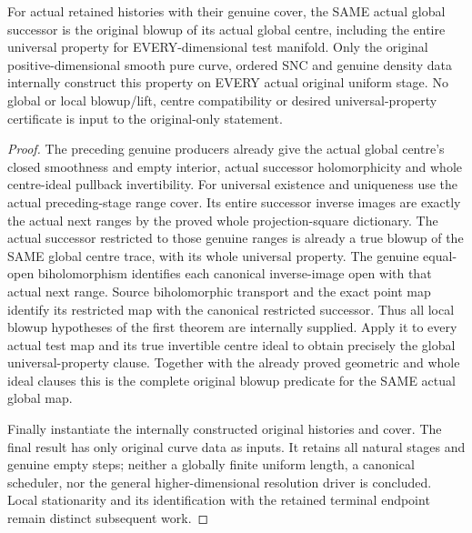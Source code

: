 \begin{theorem}
\label{hir:sharp-actual-curve-global-successor-blowup}
\leanok
For actual retained histories with their genuine cover, the SAME actual
global successor is the original blowup of its actual global centre,
including the entire universal property for EVERY-dimensional test
manifold. Only the original positive-dimensional smooth pure curve,
ordered SNC and genuine density data internally construct this property
on EVERY actual original uniform stage. No global or local blowup/lift,
centre compatibility or desired universal-property certificate is input
to the original-only statement.
\end{theorem}
\begin{proof}
The preceding genuine producers already give the actual global centre's
closed smoothness and empty interior, actual successor holomorphicity
and whole centre-ideal pullback invertibility. For universal existence
and uniqueness use the actual preceding-stage range cover. Its entire
successor inverse images are exactly the actual next ranges by the proved
whole projection-square dictionary. The actual successor restricted to
those genuine ranges is already a true blowup of the SAME global centre
trace, with its whole universal property. The genuine equal-open
biholomorphism identifies each canonical inverse-image open with that
actual next range. Source biholomorphic transport and the exact point
map identify its restricted map with the canonical restricted successor.
Thus all local blowup hypotheses of the first theorem are internally
supplied. Apply it to every actual test map and its true invertible
centre ideal to obtain precisely the global universal-property clause.
Together with the already proved geometric and whole ideal clauses this
is the complete original blowup predicate for the SAME actual global map.

Finally instantiate the internally constructed original histories and
cover. The final result has only original curve data as inputs. It retains
all natural stages and genuine empty steps; neither a globally finite
uniform length, a canonical scheduler, nor the general higher-dimensional
resolution driver is concluded. Local stationarity and its identification
with the retained terminal endpoint remain distinct subsequent work.
\end{proof}
